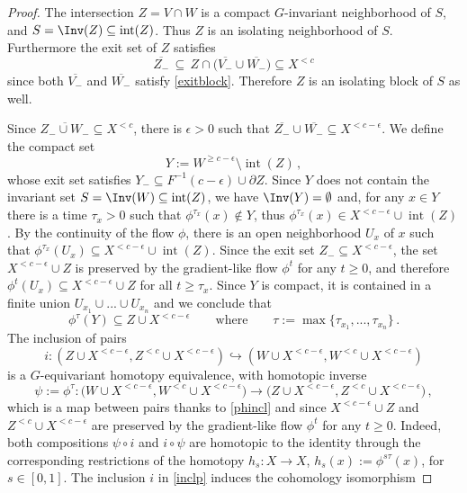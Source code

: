 \documentclass[11pt,a4paper,reqno]{article}
\DeclareMathOperator{\interior}{int}
\numberwithin{equation}{section}
\theoremstyle{definition}
\begin{document}
\begin{proof}
The intersection $Z=V\cap W$ is a compact $G$-invariant neighborhood of $S$, and 
$ S = \Inv(Z) \subseteq \interior(Z)$. Thus 
$ Z $ 
is an isolating neighborhood of $ S $. Furthermore
the exit set of $ Z $ satisfies
\[
\overline{Z_-} \, 
\subseteq \, 
Z\cap
\big( \overline{V_-}\cup \overline{W_-} \big) 
 \subseteq 
X^{<c}
\]
since both $ \overline{V_-} $ and
$ \overline{W_-} $ satisfy \eqref{exitblock}.
Therefore $Z$ is an isolating block of $S$ as well.  

Since $\overline{Z_-\cup W_-}\subseteq X^{<c}$, there is $\epsilon>0$ such that 
$ \overline{Z_-}\cup \overline{W_-}\subseteq X^{<c-\epsilon} $. 
We define the compact set 
\[
Y:=W^{\geq c-\epsilon}\setminus\interior(Z) \, ,
\] 
whose exit set satisfies $Y_-\subseteq F^{-1}(c-\epsilon)\cup\partial Z$. Since 
$ Y $ does not contain the invariant set $ S = \Inv(W) \subseteq  \interior(Z) $, we have  
$\Inv(Y)=\emptyset$ and, for any  $x\in Y$ there is a time $\tau_x>0$ such that 
$\phi^{\tau_x}(x)\notin Y $, thus 
$\phi^{\tau_x}(x)\in X^{<c-\epsilon}\cup \interior(Z)$. By the continuity of the flow $\phi$, there is an open neighborhood $U_x$ of $x$ such that $\phi^{\tau_x}(U_x)\subseteq X^{<c-\epsilon}\cup \interior(Z)$. 
Since the exit 
set $ Z_-
\subseteq X^{<c-\epsilon}$, the set 
$X^{<c-\epsilon}\cup Z$ is preserved by the gradient-like flow $\phi^t$ for any  $t\geq0$, and therefore $\phi^{t}(U_x)\subseteq X^{<c-\epsilon}\cup Z$ for all $t\geq\tau_x$. Since $Y$ is compact, it is contained in a finite union $U_{x_1}\cup...\cup U_{x_n}$ and we conclude that  
\begin{equation}\label{phincl}
    \phi^\tau(Y)\subseteq Z \cup 
    X^{<c-\epsilon}
    \qquad \text{where}
    \qquad 
\tau:=\max\{\tau_{x_1},...,\tau_{x_n}\} \, . 
\end{equation}
The inclusion of pairs 
\begin{equation}
\label{inclp}
i:(Z\cup X^{<c-\epsilon},Z^{<c}\cup X^{<c-\epsilon})\hookrightarrow(W\cup X^{<c-\epsilon},W^{<c}\cup X^{<c-\epsilon})
\end{equation}
is a $G$-equivariant homotopy equivalence, with homotopic inverse
\[
\psi:=\phi^\tau: \big( W\cup X^{<c-\epsilon},W^{<c}\cup X^{<c-\epsilon} \big) \to \big( Z\cup X^{<c-\epsilon},Z^{<c}\cup X^{<c-\epsilon} \big) \, ,
\] 
which is a map between pairs thanks to 
\eqref{phincl} and since $X^{<c-\epsilon}\cup Z$
and $ Z^{<c} \cup X^{<c-\epsilon} $ 
are preserved by the gradient-like flow $\phi^t$ for any  $t\geq0 $.
Indeed, both compositions $\psi\circ i$ and $i\circ\psi$ are homotopic to the identity through the corresponding restrictions of the homotopy $h_s:X\to X$, $h_s(x) :=\phi^{s\tau}(x)$, for $s\in[0,1]$. The inclusion $i$ in \eqref{inclp} induces the cohomology isomorphism

\end{proof}
\end{document}
